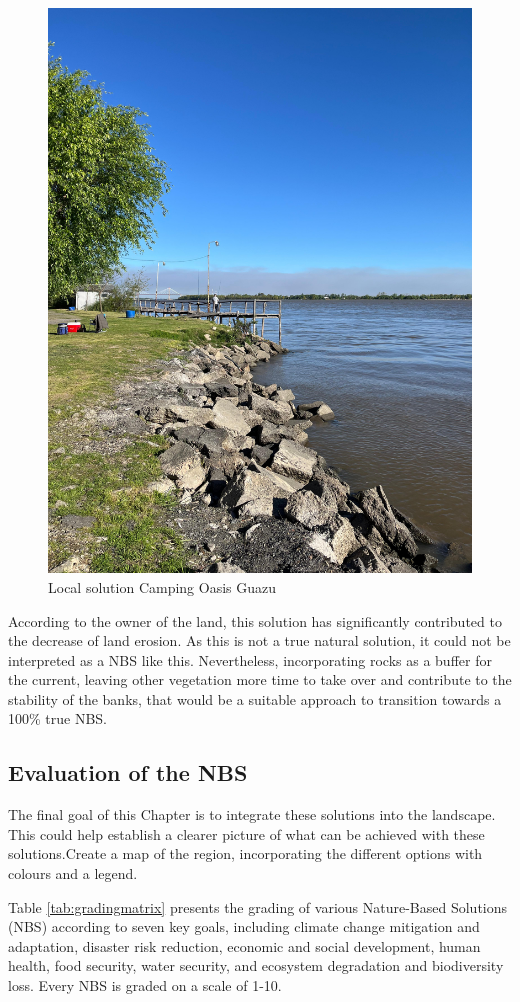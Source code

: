 \begin{figure}[H]
    \centering
    \includegraphics[width=0.5\linewidth]{figures/appendixE/rocks.jpg}
    \caption{Local solution Camping Oasis Guazu}
    \label{fig:local solution Camping Oasis Guazu}
\end{figure}

According to the owner of the land, this solution has significantly contributed to the decrease of land erosion. As this is not a true natural solution, it could not be interpreted as a NBS like this. Nevertheless, incorporating rocks as a buffer for the current, leaving other vegetation more time to take over and contribute to the stability of the banks, that would be a suitable approach to transition towards a 100\% true NBS.






\subsection{Evaluation of the NBS}

The final goal of this Chapter is to integrate these solutions into the landscape. This could help establish a clearer picture of what can be achieved with these solutions.Create a map of the region, incorporating the different options with colours and a legend.

Table \ref{tab:gradingmatrix} presents the grading of various Nature-Based Solutions (NBS) according to seven key goals, including climate change mitigation and adaptation, disaster risk reduction, economic and social development, human health, food security, water security, and ecosystem degradation and biodiversity loss. Every NBS is graded on a scale of 1-10. 

